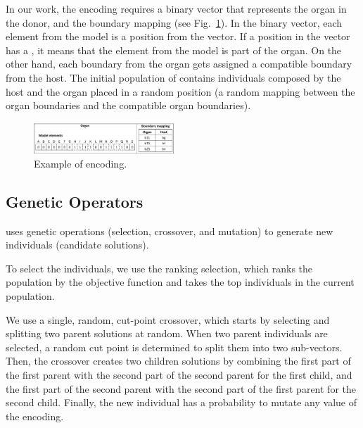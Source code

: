 In our work, the encoding requires a binary vector that represents the organ in the donor, and the boundary mapping (see Fig.~\ref{fig:encoding}). In the binary vector, each element from the model is a position from the vector. If a position in the vector has a , it means that the element from the model is part of the organ. On the other hand, each boundary from the organ gets assigned a compatible boundary from the host.
The initial population of \ApproachName{} contains individuals composed by the host and the organ placed in a random position (a random mapping between the organ boundaries and the compatible organ boundaries).

\begin{figure}[h]
    \centering
    \includegraphics[width=0.47\textwidth]{Figures/encoding.png}
    \caption{Example of encoding.}
    \label{fig:encoding}
\end{figure}

\subsection{Genetic Operators}

\ApproachName{} uses genetic operations (selection, crossover, and mutation) to generate new individuals (\ie candidate solutions). 

To select the individuals, we use the ranking selection, which ranks the population by the objective function and takes the top individuals in the current population.

We use a single, random, cut-point crossover, which starts by selecting and splitting two parent solutions at random. When two parent individuals are selected, a random cut point is determined to split them into two sub-vectors.
Then, the crossover creates two children solutions by combining the first part of the first parent with the second part of the second parent for the first child, and the first part of the second parent with the second part of the first parent for the second child.
Finally, the new individual has a probability to mutate any value of the encoding. 

